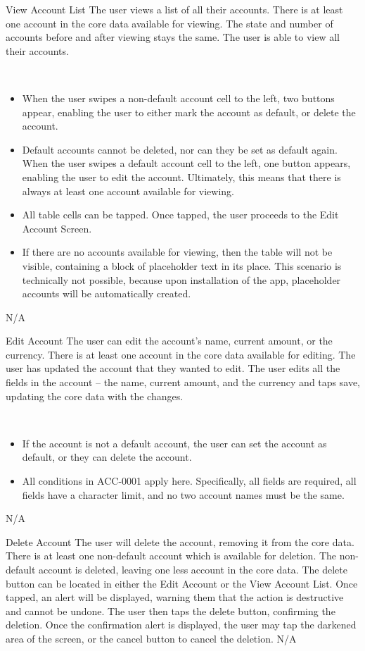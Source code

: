 	{View Account List}
    {The user views a list of all their accounts.}
    {There is at least one account in the core data available for viewing.}
    {The state and number of accounts before and after viewing stays the same.}
    {The user is able to view all their accounts.}
    {~
    \begin{itemize}
    	\item When the user swipes a non-default account cell to the left, two buttons appear, enabling the user to either mark the account as default, or delete the account.
        \item Default accounts cannot be deleted, nor can they be set as default again. When the user swipes a default account cell to the left, one button appears, enabling the user to edit the account. Ultimately, this means that there is always at least one account available for viewing.
        \item All table cells can be tapped. Once tapped, the user proceeds to the Edit Account Screen.
        \item If there are no accounts available for viewing, then the table will not be visible, containing a block of placeholder text in its place. This scenario is technically not possible, because upon installation of the app, placeholder accounts will be automatically created. 
    \end{itemize}
    }
    {N/A}
    
	{Edit Account}
    {The user can edit the account's name, current amount, or the currency.}
    {There is at least one account in the core data available for editing.}
    {The user has updated the account that they wanted to edit.}
    {The user edits all the fields in the account --  the name, current amount, and the currency and taps save, updating the core data with the changes.}
    {~
    \begin{itemize}
    	\item If the account is not a default account, the user can set the account as default, or they can delete the account.
        \item All conditions in ACC-0001 apply here. Specifically, all fields are required, all fields have a character limit, and no two account names must be the same.
    \end{itemize}}
    {N/A}
    
	{Delete Account}
    {The user will delete the account, removing it from the core data.}
    {There is at least one non-default account which is available for deletion.}
    {The non-default account is deleted, leaving one less account in the core data.}
    {The delete button can be located in either the Edit Account or the View Account List. Once tapped, an alert will be displayed, warning them that the action is destructive and cannot be undone. The user then taps the delete button, confirming the deletion.}
    {Once the confirmation alert is displayed, the user may tap the darkened area of the screen, or the cancel button to cancel the deletion.}
    {N/A}
